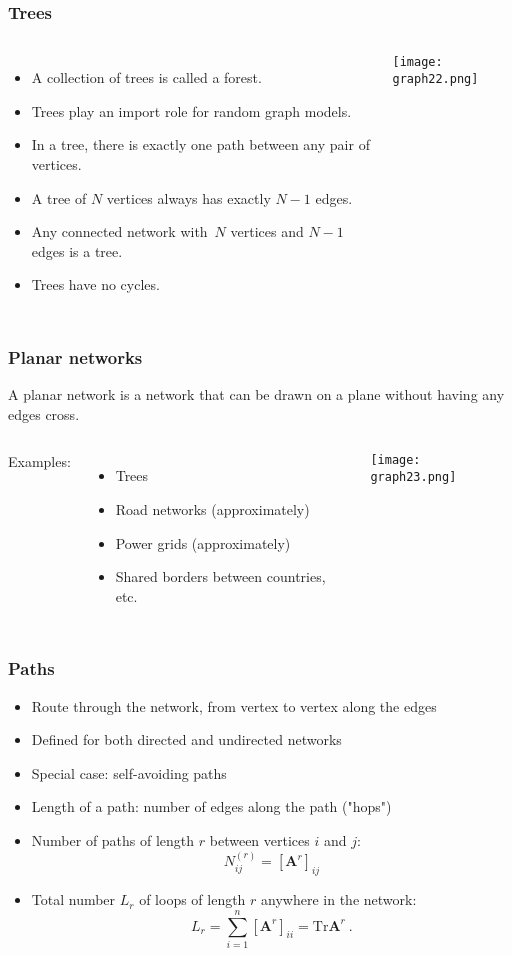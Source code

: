 \documentclass[10pt,aspectratio=169,dvipsnames]{beamer}
\let\olditem\item
\renewcommand{\item}{%
\olditem\vspace{5pt}}
\begin{document}
\begin{frame}
\frametitle{Trees}
\begin{columns}
\begin{itemize}
\item A collection of trees is called a \alert{forest}.
\item Trees play an import role for random graph models.
\item In a tree, there is exactly one path between any pair of vertices.
\item A tree of $N$ vertices always has exactly $N-1$ edges.
\item Any connected network with~$N$ vertices and $N-1$ edges is a tree.
  \item Trees have \alert{no cycles}.
\end{itemize}
\texttt{[image: graph22.png]}
\end{columns}
\end{frame}
\begin{frame}
\frametitle{Planar networks}
A \alert{planar network} is a network that can be drawn on a plane without having any edges cross.\\
\vspace{0.5cm}
\begin{columns}
Examples:
\begin{itemize}
\item Trees
\item Road networks (approximately)
\item Power grids (approximately)
\item Shared borders between countries, etc.
\end{itemize}
\texttt{[image: graph23.png]}
\end{columns}
\end{frame}
\begin{frame}
\frametitle{Paths}
\begin{itemize}
\item Route through the network, from vertex to vertex along the edges
\item Defined for both directed and undirected networks
\item Special case: self-avoiding paths
\item \alert{Length} of a path: number of edges along the path ("hops")
\item Number of paths of length $r$ between vertices $i$ and $j$:
\begin{equation*}
N_{ij}^{(r)}=\left[\mathbf{A}^{r}\right]_{ij}
\end{equation*}
\item Total number $L_{r}$ of loops of length $r$ anywhere in the network:
\begin{equation*}
L_{r}=\sum_{i=1}^{n}\left[\mathbf{A}^{r}\right]_{ii}=\text{Tr}\mathbf{A}^{r}~.
\end{equation*}
\end{itemize}
\end{frame}
\end{document}
